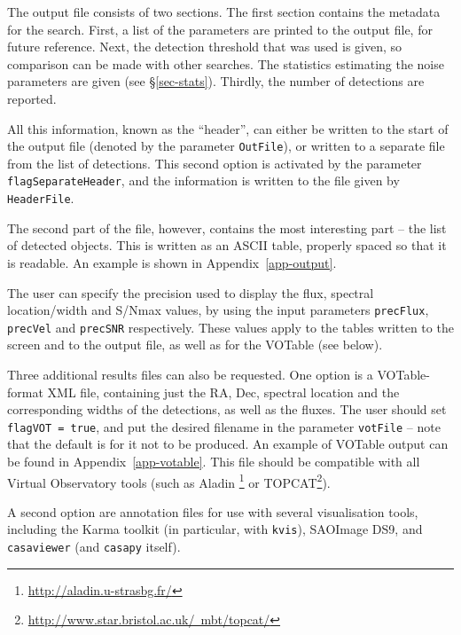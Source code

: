 The output file consists of two sections. The first section contains
the metadata for the search. First, a list of the parameters are
printed to the output file, for future reference. Next, the detection
threshold that was used is given, so comparison can be made with other
searches. The statistics estimating the noise parameters are given
(see \S\ref{sec-stats}). Thirdly, the number of detections are
reported.

All this information, known as the ``header'', can either be written
to the start of the output file (denoted by the parameter
\texttt{OutFile}), or written to a separate file from the list of
detections. This second option is activated by the parameter
\texttt{flagSeparateHeader}, and the information is written to the
file given by \texttt{HeaderFile}.

The second part of the file, however, contains the most interesting
part --  the list of detected objects. This is written as an ASCII
table, properly spaced so that it is readable. An example is shown in
Appendix~\ref{app-output}. 

The user can specify the precision used to display the flux, spectral
location/width and S/Nmax values, by using the input parameters
\texttt{precFlux}, \texttt{precVel} and \texttt{precSNR}
respectively. These values apply to the tables written to the screen
and to the output file, as well as for the VOTable (see below).


\label{sec-votable}

Three additional results files can also be requested. One option is a
VOTable-format XML file, containing just the RA, Dec, spectral
location and the corresponding widths of the detections, as well as
the fluxes. The user should set \texttt{flagVOT = true}, and put the
desired filename in the parameter \texttt{votFile} -- note that the
default is for it not to be produced. An example of VOTable output can
be found in Appendix~\ref{app-votable}.  This file should be
compatible with all Virtual Observatory tools (such as Aladin%
\footnote{%
  \href{http://aladin.u-strasbg.fr/}{http://aladin.u-strasbg.fr/}} or
TOPCAT\footnote{%
  \href{http://www.star.bristol.ac.uk/~mbt/topcat/}%
  {http://www.star.bristol.ac.uk/~mbt/topcat/}}).

\label{sec-annotfiles}

A second option are annotation files for use with several
visualisation tools, including the Karma toolkit (in particular, with
\texttt{kvis}), SAOImage DS9, and \texttt{casaviewer} (and
\texttt{casapy} itself).


